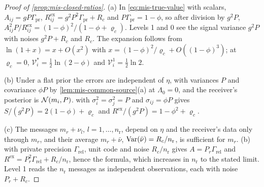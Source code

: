 \begin{proof}[Proof of \cref{prop:mis-closed-ratios}]
(a) In \eqref{eq:mis-true-value} with scalars, $A_{ij}=gP\Gamma_{\mathrm{pr}}$, $R^{\mathrm{ex}}_{ij}=g^2P^2\Gamma_{\mathrm{pr}}+R_c$ and $P\Gamma_{\mathrm{pr}}=1-\phi$, so after division by $g^2P$, $A_{ij}^2P/R^{\mathrm{ex}}_{ij}=(1-\phi)^2/(1-\phi+\varrho_c)$. Levels 1 and 0 see the signal variance $g^2P$ with noises $g^2P+R_c$ and $R_c$. The expansion follows from $\ln(1+x)=x+O(x^2)$ with $x=(1-\phi)^2/\varrho_c+O((1-\phi)^3)$; at $\varrho_c=0$, $\mathcal V^\ast_i=\tfrac12\ln(2-\phi)$ and $\mathcal V^1_i=\tfrac12\ln2$.

(b) Under a flat prior the errors are independent of $\eta$, with variances $P$ and covariance $\phi P$ by \cref{lem:mis-common-source}(a) at $\Lambda_0=0$, and the receiver's posterior is $\mathcal{N}(m_i,P)$.  with $\sigma_i^2=\sigma_j^2=P$ and $\sigma_{ij}=\phi P$ gives $S/(g^2P)=2(1-\phi)+\varrho_c$ and $R^{\mathrm{ex}}/(g^2P)=1-\phi^2+\varrho_c$.

(c) The messages $m_r+\nu_l$, $l=1,\dots,n_{\mathrm r}$, depend on $\eta$ and the receiver's data only through $m_r$, and their average $m_r+\bar\nu$, $\operatorname{Var}(\bar\nu)=R_c/n_{\mathrm r}$, is sufficient for $m_r$. (b) with private precision $\Gamma_{\mathrm{rel}}$, unit code and noise $R_c/n_{\mathrm r}$ gives $A=P_r\Gamma_{\mathrm{rel}}$ and $R^{\mathrm{ex}}=P_r^2\Gamma_{\mathrm{rel}}+R_c/n_{\mathrm r}$, hence the formula, which increases in $n_{\mathrm r}$ to the stated limit. Level 1 reads the $n_{\mathrm r}$ messages as independent observations, each with noise $P_r+R_c$.
\end{proof}

